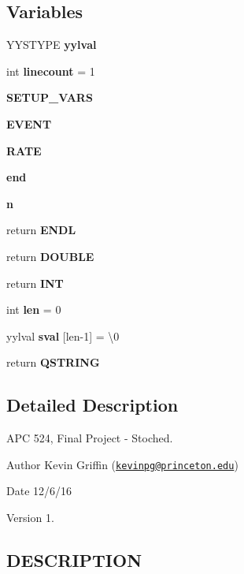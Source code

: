 \subsection*{Variables}
\begin{DoxyCompactItemize}
\item 
\mbox{\label{parser_8l_a539b86ee4bb46824a194f22eb69903d9}} 
Y\+Y\+S\+T\+Y\+PE {\bfseries yylval}
\item 
\mbox{\label{parser_8l_acf994a7eb23510cbc352de057d2f8a83}} 
int {\bfseries linecount} = 1
\item 
{\bfseries S\+E\+T\+U\+P\+\_\+\+V\+A\+RS}
\item 
{\bfseries E\+V\+E\+NT}
\item 
{\bfseries R\+A\+TE}
\item 
{\bfseries end}
\item 
{\bfseries n}
\item 
\mbox{\label{parser_8l_a054fcda831a91a860269355d2174e33c}} 
return {\bfseries E\+N\+DL}
\item 
return {\bfseries D\+O\+U\+B\+LE}
\item 
return {\bfseries I\+NT}
\item 
\mbox{\label{parser_8l_afed088663f8704004425cdae2120b9b3}} 
int {\bfseries len} = 0
\item 
\mbox{\label{parser_8l_a410bcea3c8a47acc14ebf00a43285bf9}} 
yylval {\bfseries sval} \mbox{[}len-\/1\mbox{]} = \textquotesingle{}\textbackslash{}0\textquotesingle{}
\item 
\mbox{\label{parser_8l_a2370a2496d63bc73c38c3ec4d5af62fe}} 
return {\bfseries Q\+S\+T\+R\+I\+NG}
\end{DoxyCompactItemize}


\subsection{Detailed Description}
A\+PC 524, Final Project -\/ Stoched. 

\begin{DoxyAuthor}{Author}
Kevin Griffin (\href{mailto:kevinpg@princeton.edu}{\tt kevinpg@princeton.\+edu}) 
\end{DoxyAuthor}
\begin{DoxyDate}{Date}
12/6/16 
\end{DoxyDate}
\begin{DoxyVersion}{Version}
1.
\end{DoxyVersion}
\hypertarget{event.cc_DESCRIPTION}{}\subsection{D\+E\+S\+C\+R\+I\+P\+T\+I\+ON}\label{event.cc_DESCRIPTION}


